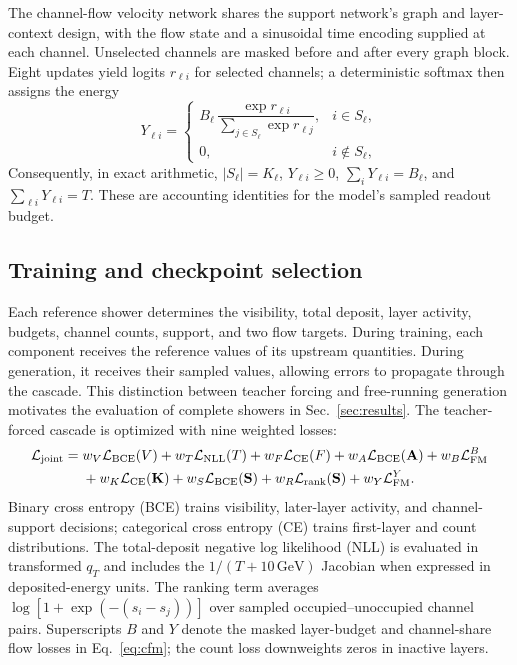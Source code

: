 \documentclass[11pt]{article}
\newcommand{\GeV}{\,\mathrm{GeV}}
\begin{document}
The channel-flow velocity network shares the support network's graph and layer-context design, with the flow state and a sinusoidal time encoding supplied at each channel. Unselected channels are masked before and after every graph block. Eight updates yield logits $r_{\ell i}$ for selected channels; a deterministic softmax then assigns the energy
\begin{equation}
 Y_{\ell i}=
 \begin{cases}
 B_\ell\,\dfrac{\exp r_{\ell i}}{\sum_{j\in S_\ell}\exp r_{\ell j}}, & i\in S_\ell,\\[6pt]
 0, & i\notin S_\ell,
 \end{cases}
 \label{eq:decoder}
\end{equation}
Consequently, in exact arithmetic, $|S_\ell|=K_\ell$, $Y_{\ell i}\geq0$, $\sum_iY_{\ell i}=B_\ell$, and $\sum_{\ell i}Y_{\ell i}=T$. These are accounting identities for the model's sampled readout budget.

\subsection{Training and checkpoint selection}

Each reference shower determines the visibility, total deposit, layer activity, budgets, channel counts, support, and two flow targets. During training, each component receives the reference values of its upstream quantities. During generation, it receives their sampled values, allowing errors to propagate through the cascade. This distinction between teacher forcing and free-running generation motivates the evaluation of complete showers in Sec.~\ref{sec:results}. The teacher-forced cascade is optimized with nine weighted losses:
\begin{equation}
 \begin{aligned}
 \mathcal L_{\rm joint}={}&w_V\mathcal L_{\rm BCE}(V)
 +w_T\mathcal L_{\rm NLL}(T)
 +w_F\mathcal L_{\rm CE}(F)
 +w_A\mathcal L_{\rm BCE}(\mathbf A)
 +w_B\mathcal L_{\rm FM}^{B}\\
 &+w_K\mathcal L_{\rm CE}(\mathbf K)
 +w_S\mathcal L_{\rm BCE}(\mathbf S)
 +w_R\mathcal L_{\rm rank}(\mathbf S)
 +w_Y\mathcal L_{\rm FM}^{Y}.
 \end{aligned}
 \label{eq:joint_loss}
\end{equation}
Binary cross entropy (BCE) trains visibility, later-layer activity, and channel-support decisions; categorical cross entropy (CE) trains first-layer and count distributions. The total-deposit negative log likelihood (NLL) is evaluated in transformed $q_T$ and includes the $1/(T+10\GeV)$ Jacobian when expressed in deposited-energy units. The ranking term averages $\log[1+\exp(-(s_i-s_j))]$ over sampled occupied--unoccupied channel pairs. Superscripts $B$ and $Y$ denote the masked layer-budget and channel-share flow losses in Eq.~\eqref{eq:cfm}; the count loss downweights zeros in inactive layers.
\end{document}
